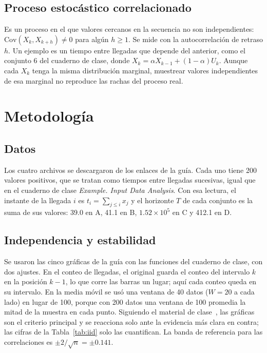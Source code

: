 \documentclass[conference]{IEEEtran}
\begin{document}
\subsection{Proceso estocástico correlacionado}
Es un proceso en el que valores cercanos en la secuencia no son independientes: $\mathrm{Cov}(X_k,X_{k+h})\neq0$ para algún $h\ge1$. Se mide con la autocorrelación de retraso $h$. Un ejemplo es un tiempo entre llegadas que depende del anterior, como el conjunto 6 del cuaderno de clase, donde $X_k=\alpha X_{k-1}+(1-\alpha)U_k$. Aunque cada $X_k$ tenga la misma distribución marginal, muestrear valores independientes de esa marginal no reproduce las rachas del proceso real.

\section{Metodología}
\subsection{Datos}
Los cuatro archivos se descargaron de los enlaces de la guía. Cada uno tiene 200 valores positivos, que se tratan como tiempos entre llegadas sucesivas, igual que en el cuaderno de clase \emph{Example. Input Data Analysis}. Con esa lectura, el instante de la llegada $i$ es $t_i=\sum_{j\le i}x_j$ y el horizonte $T$ de cada conjunto es la suma de sus valores: 39.0 en A, 41.1 en B, $1.52\times10^{5}$ en C y 412.1 en D.

\subsection{Independencia y estabilidad}
Se usaron las cinco gráficas de la guía con las funciones del cuaderno de clase, con dos ajustes. En el conteo de llegadas, el original guarda el conteo del intervalo $k$ en la posición $k-1$, lo que corre las barras un lugar; aquí cada conteo queda en su intervalo. En la media móvil se usó una ventana de 40 datos ($W=20$ a cada lado) en lugar de 100, porque con 200 datos una ventana de 100 promedia la mitad de la muestra en cada punto. Siguiendo el material de clase~\cite{clase}, las gráficas son el criterio principal y se reacciona solo ante la evidencia más clara en contra; las cifras de la Tabla~\ref{tab:iid} solo las cuantifican. La banda de referencia para las correlaciones es $\pm2/\sqrt{n}=\pm0.141$.
\end{document}
